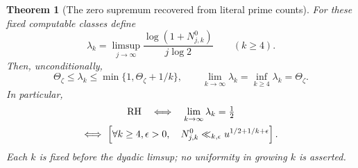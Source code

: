 \documentclass[11pt]{article}
\newtheorem{theorem}{Theorem}[section]
\theoremstyle{definition}
\begin{document}
\begin{theorem}[The zero supremum recovered from literal prime counts]
\label{thm:prime-count-exponents-zero-supremum}
For these fixed computable classes define
\[
 \lambda_k=\limsup_{j\to\infty}
       \frac{\log(1+N^0_{j,k})}{j\log2}\qquad(k\ge4).
\]
Then, unconditionally,
\begin{equation}
 \Theta_\zeta\le\lambda_k\le\min\{1,\Theta_\zeta+1/k\},
 \qquad
 \lim_{k\to\infty}\lambda_k
                =\inf_{k\ge4}\lambda_k=\Theta_\zeta .
 \label{eq:prime-count-zero-supremum-sandwich}
\end{equation}
In particular,
\begin{equation}
 \begin{gathered}
 {\rm RH}\quad\Longleftrightarrow\quad
       \lim_{k\to\infty}\lambda_k=\tfrac12\\
 \Longleftrightarrow\
 \left[\forall k\ge4,\epsilon>0,\quad
    N^0_{j,k}\ll_{k,\epsilon}u^{1/2+1/k+\epsilon}\right].
 \end{gathered}
 \label{eq:critical-prime-RH-count-criterion}
\end{equation}
Each $k$ is fixed before the dyadic limsup; no uniformity
in growing $k$ is asserted.
\end{theorem}
\end{document}
